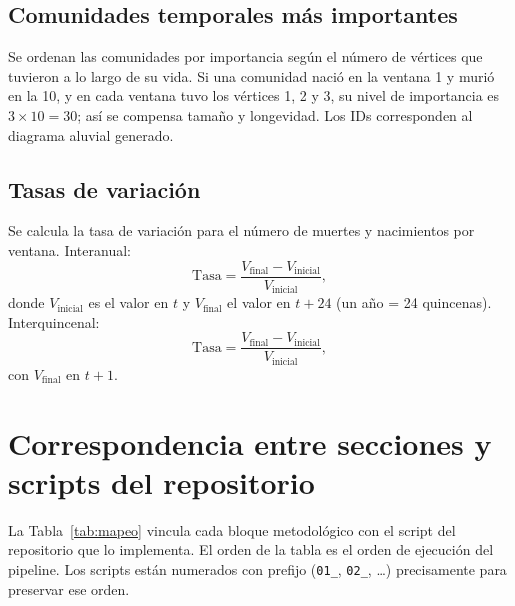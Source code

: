 \documentclass[12pt]{article}
\begin{document}
\subsection{Comunidades temporales más importantes}
Se ordenan las comunidades por importancia según el número de vértices que tuvieron a lo largo de su vida. Si una comunidad nació en la ventana 1 y murió en la 10, y en cada ventana tuvo los vértices 1, 2 y 3, su nivel de importancia es $3 \times 10 = 30$; así se compensa tamaño y longevidad. Los IDs corresponden al diagrama aluvial generado.

\subsection{Tasas de variación}
Se calcula la tasa de variación para el número de muertes y nacimientos por ventana. Interanual:
\[
\text{Tasa} = \frac{V_{\text{final}} - V_{\text{inicial}}}{V_{\text{inicial}}},
\]
donde $V_{\text{inicial}}$ es el valor en $t$ y $V_{\text{final}}$ el valor en $t+24$ (un año = 24 quincenas). Interquincenal:
\[
\text{Tasa} = \frac{V_{\text{final}} - V_{\text{inicial}}}{V_{\text{inicial}}},
\]
con $V_{\text{final}}$ en $t+1$.

\section{Correspondencia entre secciones y scripts del repositorio}
\label{sec:mapeo}

La Tabla~\ref{tab:mapeo} vincula cada bloque metodológico con el script del
repositorio que lo implementa. El orden de la tabla es el orden de ejecución
del pipeline. Los scripts están numerados con prefijo (\texttt{01\_}, \texttt{02\_},
\dots) precisamente para preservar ese orden.
\end{document}
